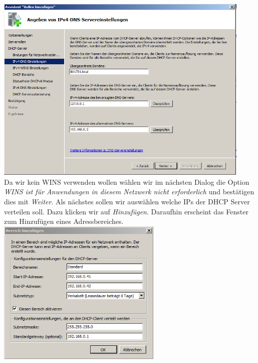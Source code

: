 \documentclass[12pt,a4paper,titlepage]{scrartcl} %
\begin{document}
	\includegraphics[height=9cm]{Bilder/041(DHCP03)}\\
	
Da wir kein WINS verwenden wollen wählen wir im nächsten Dialog die Option \emph{WINS ist für Anwendungen in diesem Netzwerk nicht erforderlich} und bestätigen dies mit \emph{Weiter}. Als nächstes sollen wir auswählen welche IPs der DHCP Server verteilen soll. Dazu klicken wir auf \emph{Hinzufügen}. Daraufhin erscheint das Fenster zum Hinzufügen eines Adressbereiches.\\

	\includegraphics[height=7cm]{Bilder/043(DHCP05)}\\
	
\end{document}
